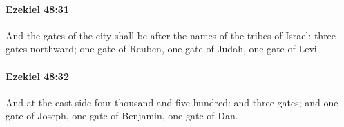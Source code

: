 		\paragraph{Ezekiel 48:31} %
			\label{EZEKIEL-48-31}

			And the gates of the city shall be after the names of the tribes of Israel: three gates northward; one gate of Reuben, one gate of Judah, one gate of Levi.


		\paragraph{Ezekiel 48:32} %
			\label{EZEKIEL-48-32}

			And at the east side four thousand and five hundred: and three gates; and one gate of Joseph, one gate of Benjamin, one gate of Dan.


